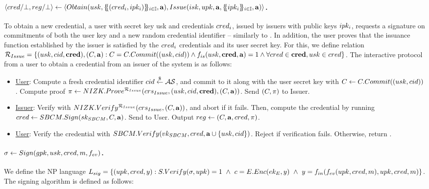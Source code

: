 \paragraph{$\langle cred/\bot,reg/\bot \rangle \gets
  \langle
  Obtain(usk,\{\mskip-5mu\{ (cred_i,ipk_i)\}\mskip-5mu\}_{i \in \mathbb{I}},\mathbf{a}),
  Issue(isk,upk,\mathbf{a},\{\mskip-5mu\{ ipk_i \}\mskip-5mu\}_{i \in \mathbb{I}},\mathbf{a})
  \rangle$.} %
To obtain a new credential, a user with secret key usk and credentials $cred_i$,
issued by issuers with public keys $ipk_i$, requests a signature on commitments
of both the user key and a new random credential identifier -- similarly to
\GSAC. In addition, the user proves that the issuance function \fissue
established by the issuer is satisfied by the $cred_i$ credentials and its user
secret key. For this, we define relation $\mathcal{R}_{Issue} = \lbrace (usk,
cid,\mathbf{cred}), (C,\mathbf{a}): C = C.Commit((usk,cid)) \land
f_{is}(usk,\mathbf{cred},\mathbf{a}) = 1 \land \forall cred \in \mathbf{cred}, usk \in cred
\rbrace$.  The interactive protocol from a user to obtain a
credential from an issuer of the system is as follows:

\begin{itemize}
\item \uline{User}: Compute a fresh credential identifier $cid \stackrel{\$}{\gets}
  \mathcal{AS}$, and commit to it along with the user secret key with
  $C \gets C.Commit((usk,cid))$. Compute proof $\pi \gets
  NIZK.Prove^{\mathcal{R}_{Issue}}(crs_{Issue},(usk,cid,\mathbf{cred}),
  (C,\mathbf{a}))$. Send $(C,\pi)$ to Issuer.
\item \uline{Issuer}: Verify \NIZKproof with $NIZK.Verify^{\mathcal{R}_{Issue}}
  (crs_{Issue},(C,\mathbf{a}))$, and abort if it fails. Then, compute
  the credential by running $cred \gets SBCM.Sign(sk_{SBCM},C,\mathbf{a})$.
  Send \cred to User. Output $reg \gets (C,\mathbf{a},cred,\pi)$.
\item \uline{User}: Verify the credential with $SBCM.Verify(vk_{SBCM},cred,
  \mathbf{a} \cup \lbrace usk,cid \rbrace)$. Reject if verification fails.
  Otherwise, return \cred.
\end{itemize}

\paragraph{$\sigma \gets Sign(gpk,usk,cred,m,f_{ev})$.} %
We define the NP language $L_{sig} = \lbrace (upk,cred,y):
S.Verify(\sigma,upk) = 1~\land~c = E.Enc(ek_{E},y)~\land~
y = f_{in}(f_{ev}(upk,cred,m),upk,cred,m)\rbrace$. The
signing algorithm is defined as follows:

